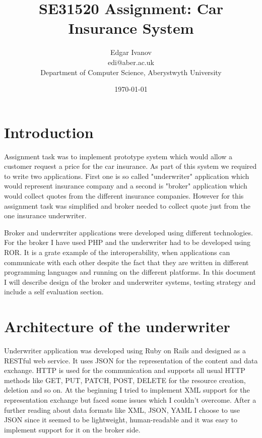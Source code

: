 \documentclass[10pt,a4paper,headinclude=true,twoside]{report}
\begin{document}
\title{SE31520 Assignment: Car Insurance System}
\author{Edgar Ivanov\\ edi@aber.ac.uk \\ Department of Computer Science, Aberystwyth University}
\date{\today}
\maketitle

\newpage
\thispagestyle{empty}
\mbox{}

\tableofcontents

\section{Introduction}
Assignment task was to implement prototype system which would allow a customer request a price for the car insurance. As part of this system we required to write two applications. First one is so called "underwriter" application which would represent insurance company and a second is "broker" application which would collect quotes from the different insurance companies. However for this assignment task was simplified and broker needed to collect quote just from the one insurance underwriter.

Broker and underwriter applications were developed using different technologies. For the broker I have used PHP and the underwriter had to be developed using ROR. It is a grate example of the interoperability, when applications can communicate with each other despite the fact that they are written in different programming languages and running on the different platforms. In this document I will describe design of the broker and underwriter systems, testing strategy and include a self evaluation section.  

\section{Architecture of the underwriter}

Underwriter application was developed using Ruby on Rails and designed as a RESTful web service. It uses JSON for the representation of the content and data exchange. HTTP is used for the communication and supports all usual HTTP methods like GET, PUT, PATCH, POST, DELETE for the resource creation, deletion and so on. At the beginning I tried to implement XML support for the representation exchange but faced some issues which I couldn't overcome. After a further reading about data formats like XML, JSON, YAML I choose to use JSON since it seemed to be lightweight, human-readable and it was easy to implement support for it on the broker side.
\end{document}
